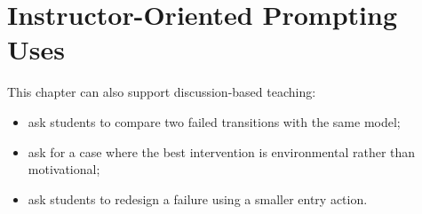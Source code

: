 \section{Instructor-Oriented Prompting Uses}

This chapter can also support discussion-based teaching:
\begin{itemize}[nosep]
  \item ask students to compare two failed transitions with the same model;
  \item ask for a case where the best intervention is environmental rather than
        motivational;
  \item ask students to redesign a failure using a smaller entry action.
\end{itemize}
